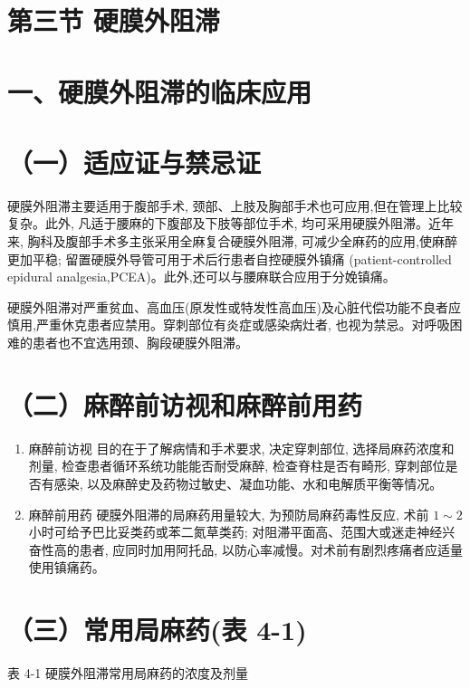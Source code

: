 \documentclass[10pt]{article}
\begin{document}
\section*{第三节 硬膜外阻滞}
\section*{一、硬膜外阻滞的临床应用}
\section*{（一）适应证与禁忌证}
硬膜外阻滞主要适用于腹部手术, 颈部、上肢及胸部手术也可应用,但在管理上比较复杂。此外, 凡适于腰麻的下腹部及下肢等部位手术, 均可采用硬膜外阻滞。近年来, 胸科及腹部手术多主张采用全麻复合硬膜外阻滞, 可减少全麻药的应用,使麻醉更加平稳; 留置硬膜外导管可用于术后行患者自控硬膜外镇痛 (patient-controlled epidural analgesia,PCEA)。此外,还可以与腰麻联合应用于分娩镇痛。

硬膜外阻滞对严重贫血、高血压(原发性或特发性高血压)及心脏代偿功能不良者应慎用,严重休克患者应禁用。穿刺部位有炎症或感染病灶者, 也视为禁忌。对呼吸困难的患者也不宜选用颈、胸段硬膜外阻滞。

\section*{（二）麻醉前访视和麻醉前用药}
\begin{enumerate}
  \item 麻醉前访视 目的在于了解病情和手术要求, 决定穿刺部位, 选择局麻药浓度和剂量, 检查患者循环系统功能能否耐受麻醉, 检查脊柱是否有畸形, 穿刺部位是否有感染, 以及麻醉史及药物过敏史、凝血功能、水和电解质平衡等情况。

  \item 麻醉前用药 硬膜外阻滞的局麻药用量较大, 为预防局麻药毒性反应, 术前 $1 \sim 2$ 小时可给予巴比妥类药或苯二氮草类药; 对阻滞平面高、范围大或迷走神经兴奋性高的患者, 应同时加用阿托品, 以防心率减慢。对术前有剧烈疼痛者应适量使用镇痛药。

\end{enumerate}

\section*{（三）常用局麻药(表 4-1)}
表 4-1 硬膜外阻滞常用局麻药的浓度及剂量
\end{document}
